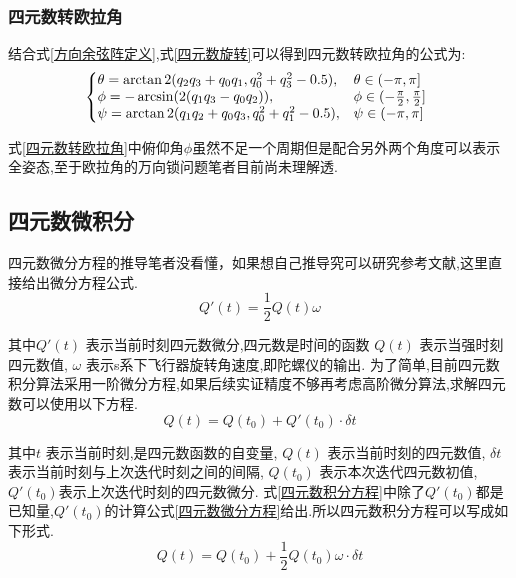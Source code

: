\subsubsection{四元数转欧拉角}
结合式\ref{方向余弦阵定义},式\ref{四元数旋转}可以得到四元数转欧拉角的公式为:
\begin{equation}\label{四元数转欧拉角}
    \left\{\!\!\!\begin{array}{ll}
        \theta = \arctan2(q_2q_3+q_0q_1,q_0^2+q_3^2-0.5), & \theta \in (-\pi, \pi]\\
        \phi   =-\arcsin(2(q_1q_3-q_0q_2)), & \phi \in (-\frac{\pi}{2}, \frac{\pi}{2}] \\
        \psi   = \arctan2(q_1q_2+q_0q_3,q_0^2+q_1^2-0.5), & \psi \in (-\pi, \pi]
    \end{array}\right.
\end{equation}

式\ref{四元数转欧拉角}中俯仰角$\phi$虽然不足一个周期但是配合另外两个角度可以表示全姿态,至于欧拉角的万向锁问题笔者目前尚未理解透.

\subsection{四元数微积分}
四元数微分方程的推导笔者没看懂，如果想自己推导究可以研究参考文献\citet{四元数微分方程的推导},这里直接给出微分方程公式.
\begin{equation}\label{四元数微分方程}
    Q'(t) = \frac{1}{2}Q(t)\omega
\end{equation} 

其中$Q'(t)$ 表示当前时刻四元数微分,四元数是时间的函数
$Q(t)$      表示当强时刻四元数值,
$\omega$    表示s系下飞行器旋转角速度,即陀螺仪的输出.
为了简单,目前四元数积分算法采用一阶微分方程,如果后续实证精度不够再考虑高阶微分算法,求解四元数可以使用以下方程.
\begin{equation}\label{四元数积分方程}
    Q(t) = Q(t_0) + Q'(t_0) \cdot \delta t
\end{equation} 

其中$t$         表示当前时刻,是四元数函数的自变量,
$Q(t)$          表示当前时刻的四元数值,
$\delta t$      表示当前时刻与上次迭代时刻之间的间隔,
$Q(t_0)$ 表示本次迭代四元数初值,
$Q'(t_0)$表示上次迭代时刻的四元数微分.
式\ref{四元数积分方程}中除了$Q'(t_0)$都是已知量,$Q'(t_0)$的计算公式\ref{四元数微分方程}给出.所以四元数积分方程可以写成如下形式.
\begin{equation}\label{四元数递推方程}
    Q(t) = Q(t_0) + \frac{1}{2}Q(t_0)\omega \cdot \delta t
\end{equation} 

